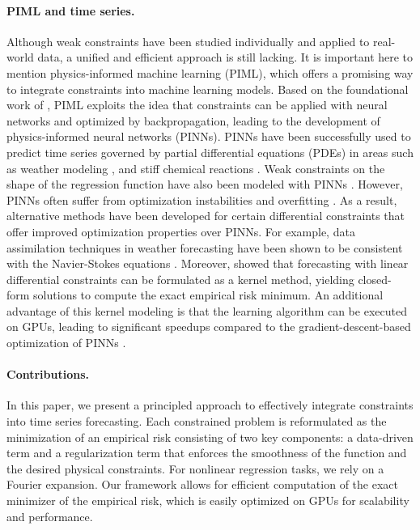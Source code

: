 \paragraph{PIML and time series.} Although  weak constraints have been studied individually and applied to real-world data, a unified and efficient approach is still lacking.
It is important here to mention physics-informed machine learning (PIML), which offers a promising way to integrate constraints into machine learning models. 
Based on the foundational work of \citet{raissi2019PINN}, PIML exploits the idea that constraints can be applied with neural networks and optimized by backpropagation, leading to the development of physics-informed neural networks (PINNs). 
PINNs have been successfully used to predict time series governed by partial differential equations (PDEs) in areas such as weather modeling \citep{kashinath2021physics}, and stiff chemical reactions \citep{ji2021stiff}. 
Weak constraints on the shape of the regression function have also been modeled with PINNs \citep[][]{daw2022lake}. 
However, PINNs often suffer from optimization instabilities and overfitting  \citep{doumeche2023convergence}.  
As a result, alternative methods have been developed for certain differential constraints that offer improved optimization properties over PINNs. For example, data assimilation techniques in weather forecasting have been shown to be consistent with the Navier-Stokes equations \citep{nickl2024on}. 
Moreover, \citet{doumeche2024physicsinformed} showed that forecasting with linear differential constraints can be formulated as a kernel method, yielding closed-form solutions to compute the exact empirical risk minimum. An additional advantage of this kernel modeling is that the learning algorithm can be executed on GPUs, leading to significant speedups compared to the gradient-descent-based optimization of PINNs \citep{doumèche2024physicsinformedkernellearning}.

\paragraph{Contributions.}
In this paper, we present a principled approach to effectively integrate constraints into time series forecasting. Each constrained problem is reformulated as the minimization of an empirical risk consisting of two key components: a data-driven term and a regularization term that enforces the smoothness of the function and the desired physical constraints.
For nonlinear regression tasks, we rely on a Fourier expansion.
Our framework allows for efficient computation of the exact minimizer of the empirical risk, which is easily optimized on GPUs for scalability and performance.


